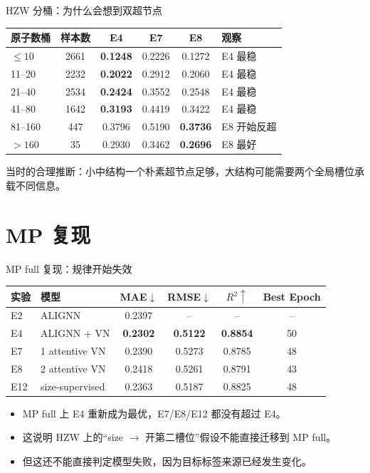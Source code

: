 \documentclass[aspectratio=169]{beamer}
\begin{document}
\begin{frame}{HZW 分桶：为什么会想到双超节点}
\scriptsize
\centering
\setlength{\tabcolsep}{4pt}
\begin{tabular}{l c c c c l}
\toprule
原子数桶 & 样本数 & E4 & E7 & E8 & 观察 \\
\midrule
$\le 10$ & 2661 & \textbf{0.1248} & 0.2226 & 0.1272 & E4 最稳 \\
11--20 & 2232 & \textbf{0.2022} & 0.2912 & 0.2060 & E4 最稳 \\
21--40 & 2534 & \textbf{0.2424} & 0.3552 & 0.2548 & E4 最稳 \\
41--80 & 1642 & \textbf{0.3193} & 0.4419 & 0.3422 & E4 最稳 \\
81--160 & 447 & 0.3796 & 0.5190 & \textbf{0.3736} & E8 开始反超 \\
$>160$ & 35 & 0.2930 & 0.3462 & \textbf{0.2696} & E8 最好 \\
\bottomrule
\end{tabular}

\vspace{2mm}
\small
当时的合理推断：小中结构一个朴素超节点足够，大结构可能需要两个全局槽位承载不同信息。
\end{frame}

\section{MP 复现}

\begin{frame}{MP full 复现：规律开始失效}
\scriptsize
\centering
\begin{tabular}{l l c c c c}
\toprule
实验 & 模型 & MAE$\downarrow$ & RMSE$\downarrow$ & $R^2\uparrow$ & Best Epoch \\
\midrule
E2 & ALIGNN & 0.2397 & -- & -- & -- \\
E4 & ALIGNN + VN & \textbf{0.2302} & \textbf{0.5122} & \textbf{0.8854} & 50 \\
E7 & 1 attentive VN & 0.2390 & 0.5273 & 0.8785 & 48 \\
E8 & 2 attentive VN & 0.2418 & 0.5261 & 0.8791 & 43 \\
E12 & size-supervised & 0.2363 & 0.5187 & 0.8825 & 48 \\
\bottomrule
\end{tabular}

\vspace{2mm}
\small
\begin{itemize}
  \item MP full 上 E4 重新成为最优，E7/E8/E12 都没有超过 E4。
  \item 这说明 HZW 上的“size $\rightarrow$ 开第二槽位”假设不能直接迁移到 MP full。
  \item 但这还不能直接判定模型失败，因为目标标签来源已经发生变化。
\end{itemize}
\end{frame}
\end{document}
